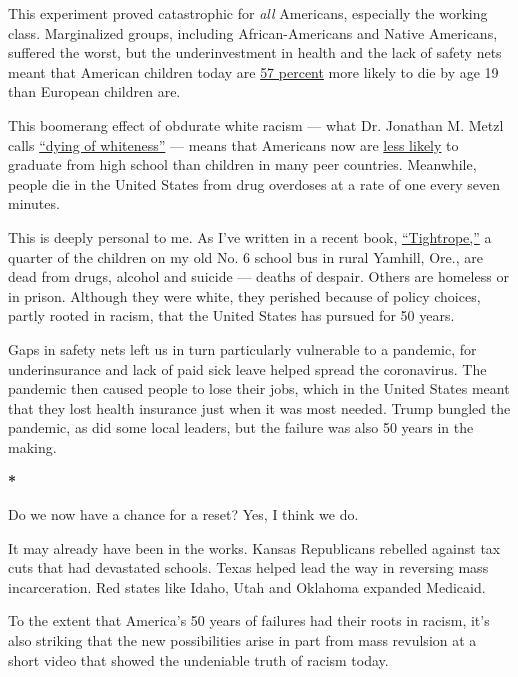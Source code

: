 This experiment proved catastrophic for \emph{all} Americans, especially
the working class. Marginalized groups, including African-Americans and
Native Americans, suffered the worst, but the underinvestment in health
and the lack of safety nets meant that American children today are
\href{https://www.healthaffairs.org/doi/abs/10.1377/hlthaff.2017.0767}{57
percent} more likely to die by age 19 than European children are.

This boomerang effect of obdurate white racism --- what Dr. Jonathan M.
Metzl calls \href{https://www.dyingofwhiteness.com/}{``dying of
whiteness''} --- means that Americans now are
\href{https://www.socialprogress.org/?tab=2\&code=USA}{less likely} to
graduate from high school than children in many peer countries.
Meanwhile, people die in the United States from drug overdoses at a rate
of one every seven minutes.

This is deeply personal to me. As I've written in a recent book,
\href{https://www.penguinrandomhouse.com/books/588999/tightrope-by-nicholas-d-kristof-and-sheryl-wudunn/}{``Tightrope,''}
a quarter of the children on my old No. 6 school bus in rural Yamhill,
Ore., are dead from drugs, alcohol and suicide --- deaths of despair.
Others are homeless or in prison. Although they were white, they
perished because of policy choices, partly rooted in racism, that the
United States has pursued for 50 years.

Gaps in safety nets left us in turn particularly vulnerable to a
pandemic, for underinsurance and lack of paid sick leave helped spread
the coronavirus. The pandemic then caused people to lose their jobs,
which in the United States meant that they lost health insurance just
when it was most needed. Trump bungled the pandemic, as did some local
leaders, but the failure was also 50 years in the making.

\textbf{*}

Do we now have a chance for a reset? Yes, I think we do.

It may already have been in the works. Kansas Republicans rebelled
against tax cuts that had devastated schools. Texas helped lead the way
in reversing mass incarceration. Red states like Idaho, Utah and
Oklahoma expanded Medicaid.

To the extent that America's 50 years of failures had their roots in
racism, it's also striking that the new possibilities arise in part from
mass revulsion at a short video that showed the undeniable truth of
racism today.

